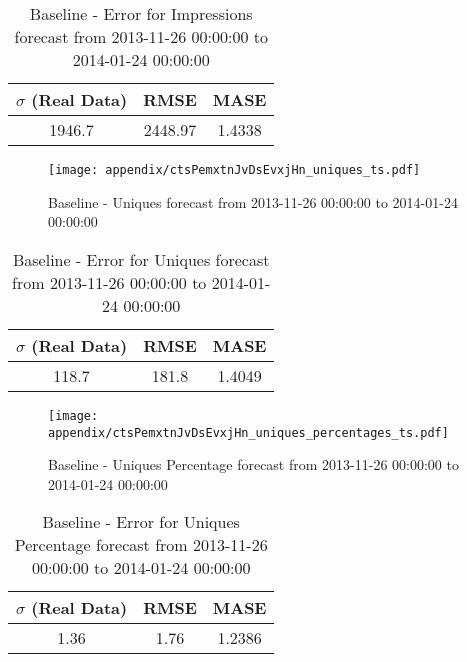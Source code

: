 \begin{table}[H]
\centering
\footnotesize
\begin{tabular}{ccc}
$\sigma$ (Real Data) & RMSE & MASE   \\ \hline
1946.7 & 2448.97 & 1.4338 \\
\end{tabular}

\vspace{0.5cm}

\caption{
Baseline - Error for Impressions forecast from 2013-11-26 00:00:00 to 2014-01-24 00:00:00}
\end{table}

\begin{figure}[H] \begin{center} \leavevmode
\texttt{[image: appendix/ctsPemxtnJvDsEvxjHn\_uniques\_ts.pdf]} \caption{
Baseline - Uniques forecast from 2013-11-26 00:00:00 to 2014-01-24 00:00:00} \label{fig:appendix/ctsPemxtnJvDsEvxjHn_uniques_ts.pdf} \end{center}
\end{figure}

\begin{table}[H]
\centering
\footnotesize
\begin{tabular}{ccc}
$\sigma$ (Real Data) & RMSE & MASE   \\ \hline
118.7 & 181.8 & 1.4049 \\
\end{tabular}

\vspace{0.5cm}

\caption{
Baseline - Error for Uniques forecast from 2013-11-26 00:00:00 to 2014-01-24 00:00:00}
\end{table}

\begin{figure}[H] \begin{center} \leavevmode
\texttt{[image: appendix/ctsPemxtnJvDsEvxjHn\_uniques\_percentages\_ts.pdf]} \caption{
Baseline - Uniques Percentage forecast from 2013-11-26 00:00:00 to 2014-01-24 00:00:00} \label{fig:appendix/ctsPemxtnJvDsEvxjHn_uniques_percentages_ts.pdf} \end{center}
\end{figure}

\begin{table}[H]
\centering
\footnotesize
\begin{tabular}{ccc}
$\sigma$ (Real Data) & RMSE & MASE   \\ \hline
1.36 & 1.76 & 1.2386 \\
\end{tabular}

\vspace{0.5cm}

\caption{
Baseline - Error for Uniques Percentage forecast from 2013-11-26 00:00:00 to 2014-01-24 00:00:00}
\end{table}

